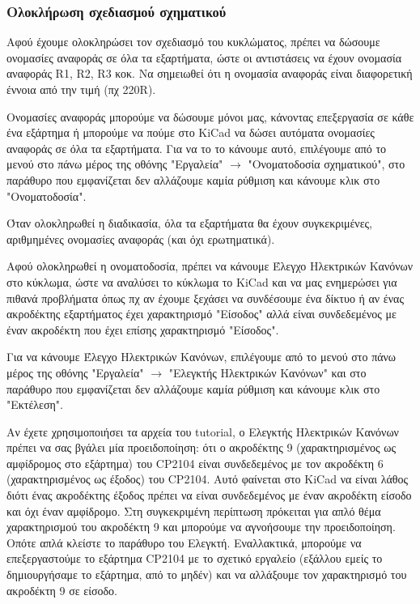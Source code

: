 \documentclass[a4paper]{article}
\begin{document}
\subsubsection{Ολοκλήρωση σχεδιασμού σχηματικού}
Αφού έχουμε ολοκληρώσει τον σχεδιασμό του κυκλώματος, πρέπει να δώσουμε ονομασίες αναφοράς σε όλα τα εξαρτήματα, ώστε οι αντιστάσεις να έχουν ονομασία αναφοράς R1, R2, R3 κοκ. Να σημειωθεί ότι η ονομασία αναφοράς είναι διαφορετική έννοια από την τιμή (πχ 220R). 

Ονομασίες αναφοράς μπορούμε να δώσουμε μόνοι μας, κάνοντας επεξεργασία σε κάθε ένα εξάρτημα ή μπορούμε να πούμε στο \textenglish{KiCad} να δώσει αυτόματα ονομασίες αναφοράς σε όλα τα εξαρτήματα. Για να το το κάνουμε αυτό, επιλέγουμε από το μενού στο πάνω μέρος της οθόνης "Εργαλεία" $\rightarrow$ "Ονοματοδοσία σχηματικού", στο παράθυρο που εμφανίζεται δεν αλλάζουμε καμία ρύθμιση και κάνουμε κλικ στο "Ονοματοδοσία".

\begin{figure}
  \begin{center}
    \label{fig:kicad-main}
  \end{center}
\end{figure}

Όταν ολοκληρωθεί η διαδικασία, όλα τα εξαρτήματα θα έχουν συγκεκριμένες, αριθμημένες ονομασίες αναφοράς (και όχι ερωτηματικά).

Αφού ολοκληρωθεί η ονοματοδοσία, πρέπει να κάνουμε Έλεγχο Ηλεκτρικών Κανόνων στο κύκλωμα, ώστε να αναλύσει το κύκλωμα το \textenglish{KiCad} και να μας ενημερώσει για πιθανά προβλήματα όπως πχ αν έχουμε ξεχάσει να συνδέσουμε ένα δίκτυο ή αν ένας ακροδέκτης εξαρτήματος έχει χαρακτηρισμό "Είσοδος" αλλά είναι συνδεδεμένος με έναν ακροδέκτη που έχει επίσης χαρακτηρισμό "Είσοδος".

Για να κάνουμε Έλεγχο Ηλεκτρικών Κανόνων, επιλέγουμε από το μενού στο πάνω μέρος της οθόνης "Εργαλεία" $\rightarrow$ "Ελεγκτής Ηλεκτρικών Κανόνων" και στο παράθυρο που εμφανίζεται δεν αλλάζουμε καμία ρύθμιση και κάνουμε κλικ στο "Εκτέλεση". 

Αν έχετε χρησιμοποιήσει τα αρχεία του tutorial, ο Ελεγκτής Ηλεκτρικών Κανόνων πρέπει να σας βγάλει μία προειδοποίηση: ότι ο ακροδέκτης 9 (χαρακτηρισμένος ως αμφίδρομος στο εξάρτημα) του \textenglish{CP2104} είναι συνδεδεμένος με τον ακροδέκτη 6 (χαρακτηρισμένος ως έξοδος) του \textenglish{CP2104}. Αυτό φαίνεται στο \textenglish{KiCad} να είναι λάθος διότι ένας ακροδέκτης έξοδος πρέπει να είναι συνδεδεμένος με έναν ακροδέκτη είσοδο και όχι έναν αμφίδρομο. Στη συγκεκριμένη περίπτωση πρόκειται για απλό θέμα χαρακτηρισμού του ακροδέκτη 9 και μπορούμε να αγνοήσουμε την προειδοποίηση. Οπότε απλά κλείστε το παράθυρο του Ελεγκτή.
Εναλλακτικά, μπορούμε να επεξεργαστούμε το εξάρτημα \textenglish{CP2104} με το σχετικό εργαλείο (εξάλλου εμείς το δημιουργήσαμε το εξάρτημα, από το μηδέν) και να αλλάξουμε τον χαρακτηρισμό του ακροδέκτη 9 σε είσοδο.
\end{document}
